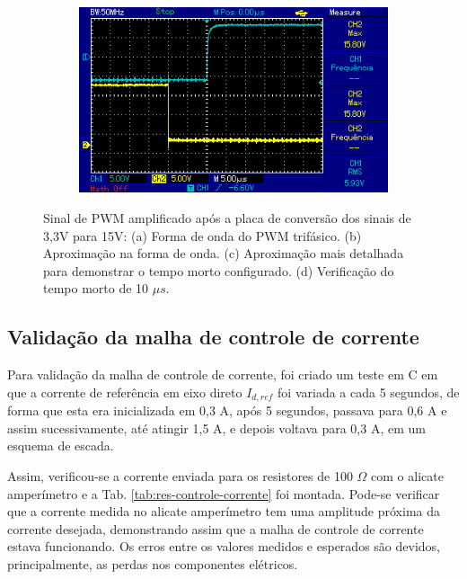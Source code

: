 \begin{figure}[!hbt]
\begin{subfigure}[b]{0.49\textwidth}
		\caption{}
	\end{subfigure}
	\begin{subfigure}[b]{0.49\textwidth}
		\centering
		\includegraphics[width=\textwidth]{figuras/resultados_tempo_morto2.png}
		\caption{}
	\end{subfigure}
	\caption{Sinal de PWM amplificado após a placa de conversão dos sinais de 3,3V para 15V: (a) Forma de onda do PWM trifásico. (b) Aproximação na forma de onda. (c) Aproximação mais detalhada para demonstrar o tempo morto configurado. (d) Verificação do tempo morto de 10 $\mu s$.}
    \label{fig:res-pwm}
\end{figure}

\subsection{Validação da malha de controle de corrente}

Para validação da malha de controle de corrente, foi criado um teste em C em que a corrente de referência em eixo direto $I_{d,ref}$ 
foi variada a cada 5 segundos, de forma que esta era inicializada em 0,3 A, após 5 segundos, passava para 0,6 A e assim sucessivamente,
até atingir 1,5 A, e depois voltava para 0,3 A, em um esquema de escada.

Assim, verificou-se a corrente enviada para os resistores de 100 $\Omega$ com o alicate amperímetro e a Tab. \ref{tab:res-controle-corrente} foi montada.
Pode-se verificar que a corrente medida no alicate amperímetro tem uma amplitude próxima da corrente desejada, demonstrando assim que a malha de controle de corrente
estava funcionando. Os erros entre os valores medidos e esperados são devidos, principalmente, as perdas nos componentes elétricos.


